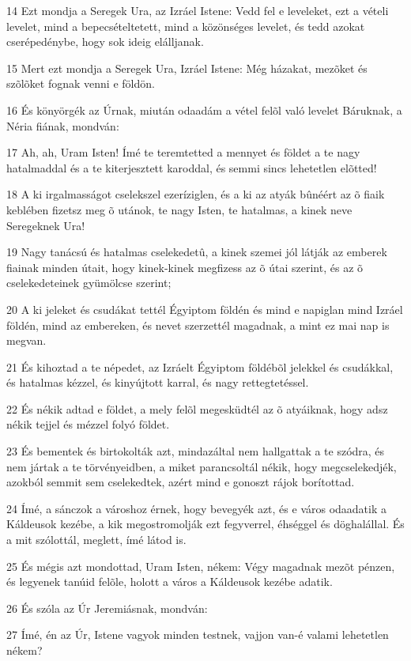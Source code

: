 \par 14 Ezt mondja a Seregek Ura, az Izráel Istene: Vedd fel e leveleket, ezt a vételi levelet, mind a bepecsételtetett, mind a közönséges levelet, és tedd azokat cserépedénybe, hogy sok ideig elálljanak.
\par 15 Mert ezt mondja a Seregek Ura, Izráel Istene: Még házakat, mezõket és szõlõket fognak venni e földön.
\par 16 És könyörgék az Úrnak, miután odaadám a vétel felõl való levelet Báruknak, a Néria fiának, mondván:
\par 17 Ah, ah, Uram Isten! Ímé te teremtetted a mennyet és földet a te nagy hatalmaddal és a te kiterjesztett karoddal, és semmi sincs lehetetlen elõtted!
\par 18 A ki irgalmasságot cselekszel ezeríziglen, és a ki az atyák bûnéért az õ fiaik keblében fizetsz meg õ utánok, te nagy Isten, te hatalmas, a kinek neve Seregeknek Ura!
\par 19 Nagy tanácsú és hatalmas cselekedetû, a kinek szemei jól látják az emberek fiainak minden  útait, hogy kinek-kinek megfizess az õ útai szerint, és az õ cselekedeteinek gyümölcse szerint;
\par 20 A ki jeleket és csudákat tettél Égyiptom földén és mind e napiglan mind Izráel földén, mind az embereken, és nevet szerzettél magadnak, a mint ez mai nap is megvan.
\par 21 És kihoztad a te népedet, az Izráelt Égyiptom földébõl jelekkel és csudákkal, és hatalmas kézzel, és kinyújtott karral, és nagy rettegtetéssel.
\par 22 És nékik adtad e földet, a mely felõl megesküdtél az õ atyáiknak, hogy adsz nékik tejjel és mézzel folyó földet.
\par 23 És bementek és birtokolták azt, mindazáltal nem hallgattak a te szódra, és nem jártak a te törvényeidben, a miket parancsoltál nékik, hogy megcselekedjék, azokból semmit sem cselekedtek, azért mind e gonoszt rájok borítottad.
\par 24 Ímé, a sánczok a városhoz érnek, hogy bevegyék azt, és e város odaadatik a Káldeusok kezébe, a kik megostromolják ezt fegyverrel, éhséggel és döghalállal. És a mit szólottál, meglett, ímé látod is.
\par 25 És mégis azt mondottad, Uram Isten, nékem: Végy magadnak mezõt pénzen, és legyenek tanúid felõle, holott a város a Káldeusok kezébe adatik.
\par 26 És szóla az Úr Jeremiásnak, mondván:
\par 27 Ímé, én az Úr, Istene vagyok minden testnek, vajjon van-é valami lehetetlen nékem?
